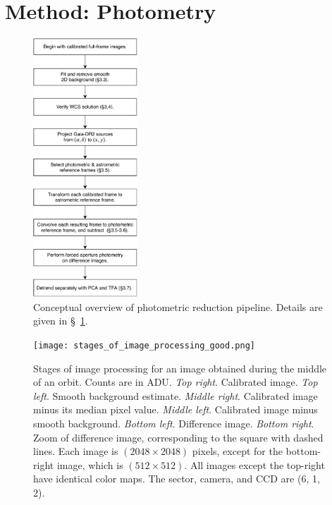 \documentclass[12pt,twocolumn,tighten,trackchanges]{aastex62}
\begin{document}
\section{Method: Photometry}
\label{sec:method}

\begin{figure}[!t]
	\begin{center}
		\leavevmode
		\includegraphics[width=0.35\textwidth]{pipelineoverview.pdf}
	\end{center}
	\vspace{-0.2cm}
	\caption{
    Conceptual overview of photometric reduction pipeline.
    Details are given in \S~\ref{sec:method}.
	\label{fig:pipeline}
	}
\end{figure}

\begin{figure}[!t]
    \begin{center}
        \leavevmode
        \texttt{[image: stages\_of\_image\_processing\_good.png]}
    \end{center}
    \vspace{-0.9cm}
    \caption{
        Stages of image processing for an image obtained during the middle
        of an orbit. Counts are in ADU.
        {\it Top right}. Calibrated image.
        {\it Top left}. Smooth background estimate.
        {\it Middle right}. Calibrated image minus its median pixel value.
        {\it Middle left}. Calibrated image minus smooth background.
        {\it Bottom left}. Difference image.
        {\it Bottom right}. Zoom of difference image, corresponding to
        the square with dashed lines.
        Each image is $(2048\times2048)$ pixels, except for the
        bottom-right image, which is $(512\times512)$.  All images
        except the top-right have identical color maps.  The sector,
        camera, and CCD are (6, 1, 2).
        \label{fig:stages_good}
    }
\end{figure}
\end{document}
